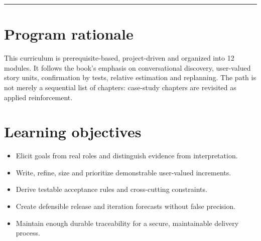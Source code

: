 \documentclass[11pt,letterpaper]{article}
\begin{document}
\tableofcontents\medskip\noindent\rule{\linewidth}{0.4pt}\medskip
\section{Program rationale}
This curriculum is prerequisite-based, project-driven and organized into 12 modules. It follows the book’s emphasis on conversational discovery, user-valued story units, confirmation by tests, relative estimation and replanning. The path is not merely a sequential list of chapters: case-study chapters are revisited as applied reinforcement.

\section{Learning objectives}
\begin{itemize}[leftmargin=*,itemsep=2pt]
\item Elicit goals from real roles and distinguish evidence from interpretation.
\item Write, refine, size and prioritize demonstrable user-valued increments.
\item Derive testable acceptance rules and cross-cutting constraints.
\item Create defensible release and iteration forecasts without false precision.
\item Maintain enough durable traceability for a secure, maintainable delivery process.
\end{itemize}
\end{document}
